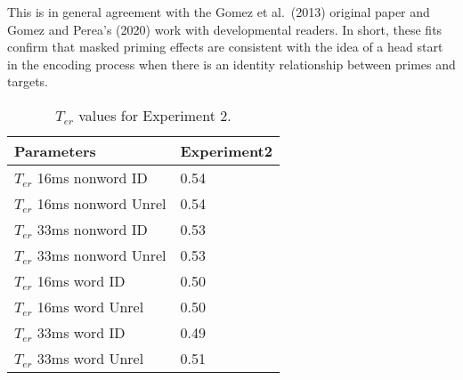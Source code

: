 \documentclass[
  english,
  man]{apa6}
\begin{document}
\begin{appendix}
\begin{table}[tbp]
\begin{center}
\begin{threeparttable}
\end{threeparttable}
\end{center}

\end{table}

This is in general agreement with the Gomez et al.~(2013) original paper
and Gomez and Perea's (2020) work with developmental readers. In short,
these fits confirm that masked priming effects are consistent with the
idea of a head start in the encoding process when there is an identity
relationship between primes and targets.

\begin{table}[tbp]

\begin{center}
\begin{threeparttable}

\caption{\label{tab:appendix_table_3} $T_{er}$ values for Experiment 2.}

\begin{tabular}{ll}
\toprule
Parameters & \multicolumn{1}{c}{Experiment2}\\
\midrule
$T_{er}$ 16ms nonword ID & 0.54\\
$T_{er}$ 16ms nonword Unrel & 0.54\\
$T_{er}$ 33ms nonword ID & 0.53\\
$T_{er}$ 33ms nonword Unrel & 0.53\\
$T_{er}$ 16ms word ID & 0.50\\
$T_{er}$ 16ms word Unrel & 0.50\\
$T_{er}$ 33ms word ID & 0.49\\
$T_{er}$ 33ms word Unrel & 0.51\\
\bottomrule
\end{tabular}

\end{threeparttable}
\end{center}

\end{table}
\end{appendix}
\end{document}
